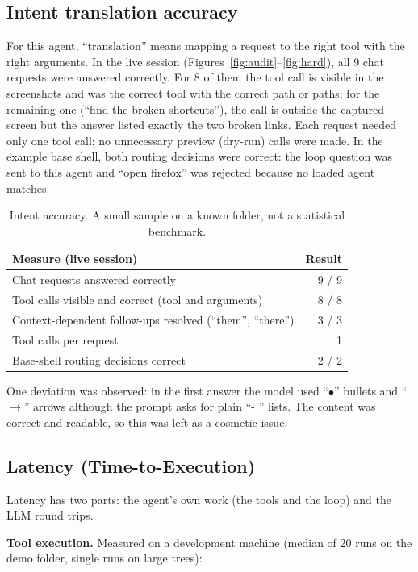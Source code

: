 \documentclass[12pt,a4paper]{article}
\begin{document}
\subsection{Intent translation accuracy}
For this agent, ``translation'' means mapping a request to the right tool with the right
arguments. In the live session (Figures~\ref{fig:audit}--\ref{fig:hard}), all 9 chat requests were
answered correctly. For 8 of them the tool call is visible in the screenshots and was the
correct tool with the correct path or paths; for the remaining one (``find the broken
shortcuts''), the call is outside the captured screen but the answer listed exactly the two
broken links. Each request needed only one tool call; no unnecessary preview (dry-run) calls
were made. In the example base shell, both routing decisions were correct: the loop question was
sent to this agent and ``open firefox'' was rejected because no loaded agent matches.

\begin{table}[H]
\centering\small
\begin{tabular}{@{}lr@{}}
\toprule
\textbf{Measure (live session)} & \textbf{Result}\\
\midrule
Chat requests answered correctly & 9 / 9\\
Tool calls visible and correct (tool and arguments) & 8 / 8\\
Context-dependent follow-ups resolved (``them'', ``there'') & 3 / 3\\
Tool calls per request & 1\\
Base-shell routing decisions correct & 2 / 2\\
\bottomrule
\end{tabular}
\caption{Intent accuracy. A small sample on a known folder, not a statistical benchmark.}
\end{table}

One deviation was observed: in the first answer the model used ``$\bullet$'' bullets and
``$\rightarrow$'' arrows although the prompt asks for plain ``- '' lists. The content was correct
and readable, so this was left as a cosmetic issue.

\subsection{Latency (Time-to-Execution)}
Latency has two parts: the agent's own work (the tools and the loop) and the LLM round trips.

\textbf{Tool execution.} Measured on a development machine (median of 20 runs on the demo folder,
single runs on large trees):
\end{document}
